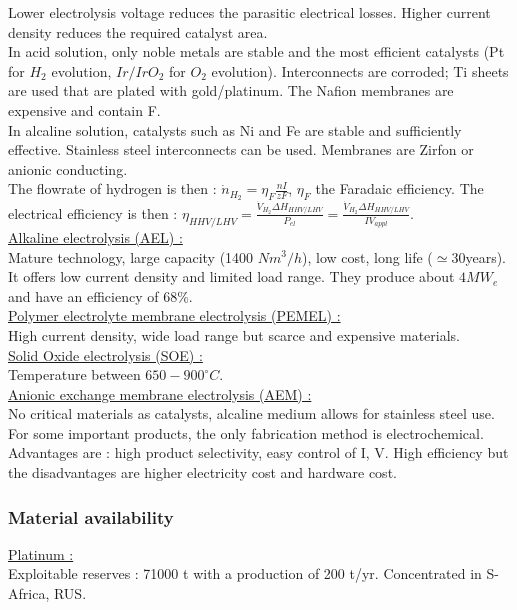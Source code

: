\documentclass[../main.tex]{subfiles}
\begin{document}
Lower electrolysis voltage reduces the parasitic electrical losses. Higher current density reduces the required catalyst area.\\
In acid solution, only noble metals are stable and the most efficient catalysts (Pt for $H_2$ evolution, $Ir/IrO_2$ for $O_2$ evolution). Interconnects are corroded; Ti sheets are used that are plated with gold/platinum. The Nafion membranes are expensive and contain F.\\
In alcaline solution, catalysts such as Ni and Fe are stable and sufficiently effective. Stainless steel interconnects can be used. Membranes are Zirfon or anionic conducting.\\
The flowrate of hydrogen is then : $\dot{n}_{H_2} = \eta_F \frac{nI}{zF}$, $\eta_F$ the Faradaic efficiency. The electrical efficiency is then : $\eta_{HHV/LHV} = \frac{\dot{V}_{H_2} \Delta H_{HHV/LHV}}{P_{el}} = \frac{\dot{V}_{H_2} \Delta H_{HHV/LHV}}{I V_{appl}}$.\\

\quad \underline{Alkaline electrolysis (AEL) :}\\
Mature technology, large capacity (1400 $Nm^3/h$), low cost, long life ($\simeq 30$years). It offers low current density and limited load range. They produce about $4MW_e$ and have an efficiency of $68\%$.\\

\quad \underline{Polymer electrolyte membrane electrolysis (PEMEL) :}\\
High current density, wide load range but scarce and expensive materials.\\

\quad \underline{Solid Oxide electrolysis (SOE) :}\\
Temperature between $650-900^\circ C$. \\

\quad \underline{Anionic exchange membrane electrolysis (AEM) :}\\
No critical materials as catalysts, alcaline medium allows for stainless steel use.\\

For some important products, the only fabrication method is electrochemical. Advantages are : high product selectivity, easy control of I, V. High efficiency but the disadvantages are  higher electricity cost and hardware cost.

\subsubsection{Material availability}
\quad \underline{Platinum :}\\
Exploitable reserves : 71000 t with a production of 200 t/yr. Concentrated in S-Africa, RUS. \\
\end{document}
